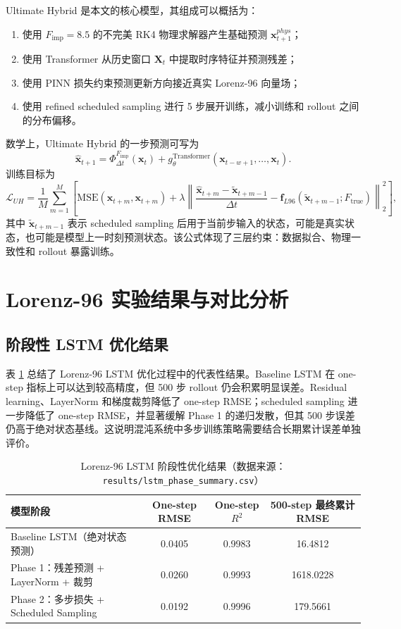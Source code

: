 \documentclass[UTF8,a4paper,12pt]{ctexart}
\newcommand{\xvec}{\mathbf{x}}
\newcommand{\dt}{\Delta t}
\newcommand{\mse}{\mathrm{MSE}}
\begin{document}
Ultimate Hybrid 是本文的核心模型，其组成可以概括为：
\begin{enumerate}
    \item 使用 $F_{\mathrm{imp}}=8.5$ 的不完美 RK4 物理求解器产生基础预测 $\xvec^{phys}_{t+1}$；
    \item 使用 Transformer 从历史窗口 $\mathbf{X}_t$ 中提取时序特征并预测残差；
    \item 使用 PINN 损失约束预测更新方向接近真实 Lorenz-96 向量场；
    \item 使用 refined scheduled sampling 进行 5 步展开训练，减小训练和 rollout 之间的分布偏移。
\end{enumerate}
数学上，Ultimate Hybrid 的一步预测可写为
\begin{equation}
\hat{\xvec}_{t+1}
=
\Phi_{\dt}^{F_{\mathrm{imp}}}(\xvec_t)
+
g_{\theta}^{\mathrm{Transformer}}(\xvec_{t-w+1},\dots,\xvec_t).
\end{equation}
训练目标为
\begin{equation}
\mathcal{L}_{UH}
=
\frac{1}{M}\sum_{m=1}^{M}
\left[
\mse(\hat{\xvec}_{t+m},\xvec_{t+m})
+
\lambda
\left\|
\frac{\hat{\xvec}_{t+m}-\tilde{\xvec}_{t+m-1}}{\dt}
-
\mathbf{f}_{L96}(\tilde{\xvec}_{t+m-1};F_{\mathrm{true}})
\right\|_2^2
\right],
\end{equation}
其中 $\tilde{\xvec}_{t+m-1}$ 表示 scheduled sampling 后用于当前步输入的状态，可能是真实状态，也可能是模型上一时刻预测状态。该公式体现了三层约束：数据拟合、物理一致性和 rollout 暴露训练。

\section{Lorenz-96 实验结果与对比分析}

\subsection{阶段性 LSTM 优化结果}

表 \ref{tab:lstm_phase} 总结了 Lorenz-96 LSTM 优化过程中的代表性结果。Baseline LSTM 在 one-step 指标上可以达到较高精度，但 500 步 rollout 仍会积累明显误差。Residual learning、LayerNorm 和梯度裁剪降低了 one-step RMSE；scheduled sampling 进一步降低了 one-step RMSE，并显著缓解 Phase 1 的递归发散，但其 500 步误差仍高于绝对状态基线。这说明混沌系统中多步训练策略需要结合长期累计误差单独评价。

\begin{table}[htbp]
\centering
\caption{Lorenz-96 LSTM 阶段性优化结果（数据来源：\texttt{results/lstm\_phase\_summary.csv}）}
\label{tab:lstm_phase}
\small
\begin{tabularx}{\textwidth}{@{}>{\raggedright\arraybackslash}Xccc@{}}
\toprule
模型阶段 & One-step RMSE & One-step $R^2$ & 500-step 最终累计 RMSE \\
\midrule
Baseline LSTM（绝对状态预测） & 0.0405 & 0.9983 & 16.4812 \\
Phase 1：残差预测 + LayerNorm + 裁剪 & 0.0260 & 0.9993 & 1618.0228 \\
Phase 2：多步损失 + Scheduled Sampling & 0.0192 & 0.9996 & 179.5661 \\
\bottomrule
\end{tabularx}
\end{table}
\end{document}
